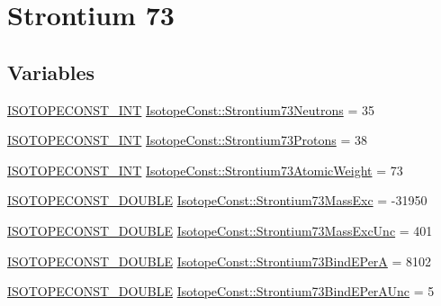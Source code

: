 \hypertarget{group___isotope_const-_strontium-_sr73}{}\section{Strontium 73}
\label{group___isotope_const-_strontium-_sr73}
\subsection*{Variables}
\begin{DoxyCompactItemize}
\item 
\mbox{\hyperlink{group___isotope_const-_macros_ga5f18360b3e99483a35c32d789e62621c}{I\+S\+O\+T\+O\+P\+E\+C\+O\+N\+S\+T\+\_\+\+I\+NT}} \mbox{\hyperlink{group___isotope_const-_strontium-_sr73_gafa2edbab75a02a1a03a88e78d89fb9e2}{Isotope\+Const\+::\+Strontium73\+Neutrons}} = 35
\item 
\mbox{\hyperlink{group___isotope_const-_macros_ga5f18360b3e99483a35c32d789e62621c}{I\+S\+O\+T\+O\+P\+E\+C\+O\+N\+S\+T\+\_\+\+I\+NT}} \mbox{\hyperlink{group___isotope_const-_strontium-_sr73_ga0a222355f994726c59b9d6c38116fb4c}{Isotope\+Const\+::\+Strontium73\+Protons}} = 38
\item 
\mbox{\hyperlink{group___isotope_const-_macros_ga5f18360b3e99483a35c32d789e62621c}{I\+S\+O\+T\+O\+P\+E\+C\+O\+N\+S\+T\+\_\+\+I\+NT}} \mbox{\hyperlink{group___isotope_const-_strontium-_sr73_ga1f92d649762385cb9786d6d06ed005af}{Isotope\+Const\+::\+Strontium73\+Atomic\+Weight}} = 73
\item 
\mbox{\hyperlink{group___isotope_const-_macros_ga8f45a7272ce02c0b4c65c44636ed719a}{I\+S\+O\+T\+O\+P\+E\+C\+O\+N\+S\+T\+\_\+\+D\+O\+U\+B\+LE}} \mbox{\hyperlink{group___isotope_const-_strontium-_sr73_ga7a6dcdac6ad54691fc499686550464b7}{Isotope\+Const\+::\+Strontium73\+Mass\+Exc}} = -\/31950
\item 
\mbox{\hyperlink{group___isotope_const-_macros_ga8f45a7272ce02c0b4c65c44636ed719a}{I\+S\+O\+T\+O\+P\+E\+C\+O\+N\+S\+T\+\_\+\+D\+O\+U\+B\+LE}} \mbox{\hyperlink{group___isotope_const-_strontium-_sr73_ga58888b727f91ab28c947ce966330dcab}{Isotope\+Const\+::\+Strontium73\+Mass\+Exc\+Unc}} = 401
\item 
\mbox{\hyperlink{group___isotope_const-_macros_ga8f45a7272ce02c0b4c65c44636ed719a}{I\+S\+O\+T\+O\+P\+E\+C\+O\+N\+S\+T\+\_\+\+D\+O\+U\+B\+LE}} \mbox{\hyperlink{group___isotope_const-_strontium-_sr73_ga73f1195f44d098fd59ae36c19f76be61}{Isotope\+Const\+::\+Strontium73\+Bind\+E\+PerA}} = 8102
\item 
\mbox{\hyperlink{group___isotope_const-_macros_ga8f45a7272ce02c0b4c65c44636ed719a}{I\+S\+O\+T\+O\+P\+E\+C\+O\+N\+S\+T\+\_\+\+D\+O\+U\+B\+LE}} \mbox{\hyperlink{group___isotope_const-_strontium-_sr73_ga4b064eb773e7517d6d48649682af0b8c}{Isotope\+Const\+::\+Strontium73\+Bind\+E\+Per\+A\+Unc}} = 5

\end{DoxyCompactItemize}
